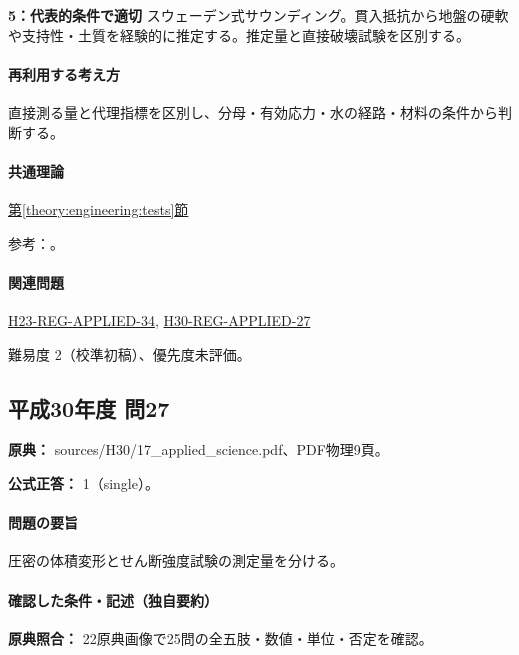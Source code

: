\noindent\textbf{5：代表的条件で適切} スウェーデン式サウンディング。貫入抵抗から地盤の硬軟や支持性・土質を経験的に推定する。推定量と直接破壊試験を区別する。\par

\paragraph{再利用する考え方} 直接測る量と代理指標を区別し、分母・有効応力・水の経路・材料の条件から判断する。

\paragraph{共通理論} \hyperref[theory:engineering:tests]{第\ref*{theory:engineering:tests}節}

\par 参考：\cite{eng52_geotech_tests,eng52_consolidation}。

\paragraph{関連問題} \hyperref[q:h23-reg-applied-34]{H23-REG-APPLIED-34}, \hyperref[q:h30-reg-applied-27]{H30-REG-APPLIED-27}

\par 難易度 2（校準初稿）、優先度未評価。

\subsection{平成30年度 問27}
\label{q:h30-reg-applied-27}

\noindent\textbf{原典：} sources/H30/17\_applied\_science.pdf、PDF物理9頁。

\textbf{公式正答：} 1（single）。

\paragraph{問題の要旨} 圧密の体積変形とせん断強度試験の測定量を分ける。

\paragraph{確認した条件・記述（独自要約）}\mbox{}\par

\noindent\textbf{原典照合：} 22原典画像で25問の全五肢・数値・単位・否定を確認。\par

